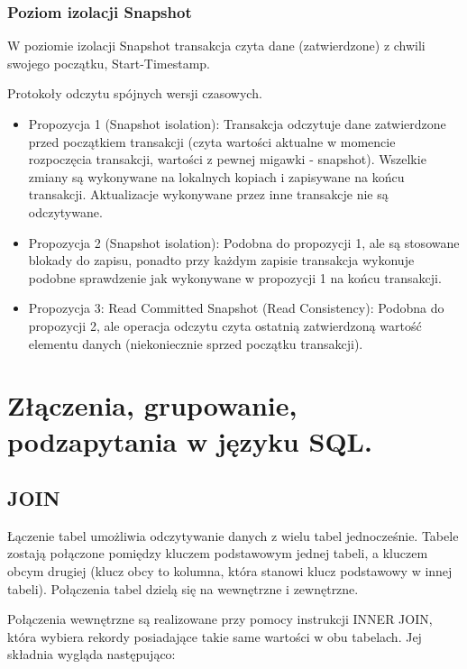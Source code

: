 \documentclass[main.tex]{subfiles}
\begin{document}
    \subsubsection{Poziom izolacji Snapshot}

    W poziomie izolacji Snapshot transakcja czyta dane (zatwierdzone) z chwili swojego
    początku, Start-Timestamp.

    Protokoły odczytu spójnych wersji czasowych.
    \begin{itemize}
        \item Propozycja 1 (Snapshot isolation): Transakcja odczytuje dane zatwierdzone przed początkiem
        transakcji (czyta wartości aktualne w momencie rozpoczęcia transakcji, wartości z pewnej
        migawki - snapshot). Wszelkie zmiany są wykonywane na lokalnych kopiach i zapisywane na
        końcu transakcji. Aktualizacje wykonywane przez inne transakcje nie są odczytywane.
        \item Propozycja 2 (Snapshot isolation):
        Podobna do propozycji 1, ale są stosowane blokady do zapisu, ponadto przy każdym zapisie
        transakcja wykonuje podobne sprawdzenie jak wykonywane w propozycji 1 na końcu
        transakcji.
        \item Propozycja 3: Read Committed Snapshot (Read Consistency):
        Podobna do propozycji 2, ale operacja odczytu czyta ostatnią zatwierdzoną wartość
        elementu danych (niekoniecznie sprzed początku transakcji).
    \end{itemize}

    \newpage

    \section{Złączenia, grupowanie, podzapytania w języku SQL.}

    \subsection{JOIN}
    Łączenie tabel umożliwia odczytywanie danych z wielu tabel jednocześnie. Tabele zostają połączone pomiędzy kluczem podstawowym jednej tabeli, a kluczem obcym drugiej (klucz obcy to kolumna, która stanowi klucz podstawowy w innej tabeli). Połączenia tabel dzielą się na wewnętrzne i zewnętrzne.

    Połączenia wewnętrzne są realizowane przy pomocy instrukcji INNER JOIN, która wybiera rekordy posiadające takie same wartości w obu tabelach. Jej składnia wygląda następująco:
\end{document}

